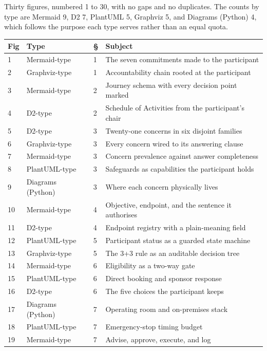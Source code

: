 Thirty figures, numbered 1 to 30, with no gaps and no duplicates. The counts by
type are Mermaid 9, D2 7, PlantUML 5, Graphviz 5, and Diagrams (Python) 4, which
follows the purpose each type serves rather than an equal quota.

\vspace{0.30em}

\noindent\begin{tabularx}{\textwidth}{C{1.0cm} L{3.6cm} C{1.0cm} Y}
\toprule
\textbf{Fig} & \textbf{Type} & \textbf{\S} & \textbf{Subject} \\
 & Mermaid-type & 1 & The seven commitments made to the participant \\
2 & Graphviz-type & 1 & Accountability chain rooted at the participant \\
3 & Mermaid-type & 2 & Journey schema with every decision point marked \\
4 & D2-type & 2 & Schedule of Activities from the participant's chair \\
5 & D2-type & 3 & Twenty-one concerns in six disjoint families \\
6 & Graphviz-type & 3 & Every concern wired to its answering clause \\
7 & Mermaid-type & 3 & Concern prevalence against answer completeness \\
8 & PlantUML-type & 3 & Safeguards as capabilities the participant holds \\
9 & Diagrams (Python) & 3 & Where each concern physically lives \\
10 & Mermaid-type & 4 & Objective, endpoint, and the sentence it authorises \\
11 & D2-type & 4 & Endpoint registry with a plain-meaning field \\
12 & PlantUML-type & 5 & Participant status as a guarded state machine \\
13 & Graphviz-type & 5 & The 3+3 rule as an auditable decision tree \\
14 & Mermaid-type & 6 & Eligibility as a two-way gate \\
15 & PlantUML-type & 6 & Direct booking and sponsor response \\
16 & D2-type & 6 & The five choices the participant keeps \\
17 & Diagrams (Python) & 7 & Operating room and on-premises stack \\
18 & PlantUML-type & 7 & Emergency-stop timing budget \\
19 & Mermaid-type & 7 & Advise, approve, execute, and log \\

\end{tabularx}
